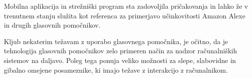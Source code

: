 \documentclass[a4paper, 12pt]{book}
\begin{document}
Mobilna aplikacija in strežniški program sta zadovoljila pričakovanja in lahko že v trenutnem stanju služita kot referenca za primerjavo učinkovitosti Amazon Alexe in drugih glasovnih pomočnikov.

Kljub nekaterim težavam z uporabo glasovnega pomočnika, je očitno, da je tehnologija glasovnih pomočnikov zelo primeren način za nadzor računalniških sistemov na daljavo.
Poleg tega ponuja veliko možnosti za slepe, slabovidne in gibalno omejene posameznike, ki imajo težave z interakcijo z računalnikom.




\newpage %
\ \\
\clearpage
{}

\printbibliography
\end{document}

